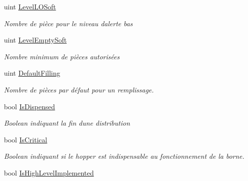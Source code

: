 \begin{DoxyCompactItemize}
uint \mbox{\hyperlink{class_device_library_1_1_c_hopper_a27713aed4b5a8f43ec2998ddec6ad5f2}{Level\+L\+O\+Soft}}
\begin{DoxyCompactList}\small\item\em Nombre de pièce pour le niveau d\textquotesingle{}alerte bas \end{DoxyCompactList}\item 
uint \mbox{\hyperlink{class_device_library_1_1_c_hopper_aa319784d7be6861029637485981d5bc8}{Level\+Empty\+Soft}}
\begin{DoxyCompactList}\small\item\em Nombre minimum de pièces autorisées \end{DoxyCompactList}\item 
uint \mbox{\hyperlink{class_device_library_1_1_c_hopper_ad75b00a2bcc10f3340ffb6b3735bea7a}{Default\+Filling}}
\begin{DoxyCompactList}\small\item\em Nombre de pièces par défaut pour un remplissage. \end{DoxyCompactList}\item 
bool \mbox{\hyperlink{class_device_library_1_1_c_hopper_a1cb25d14b95a28dcd510b354b784a4ab}{Is\+Dispensed}}
\begin{DoxyCompactList}\small\item\em Boolean indiquant la fin d\textquotesingle{}une distribution \end{DoxyCompactList}\item 
bool \mbox{\hyperlink{class_device_library_1_1_c_hopper_a08a82f43af4ac242d87e2a73734d9159}{Is\+Critical}}
\begin{DoxyCompactList}\small\item\em Boolean indiquant si le hopper est indispensable au fonctionnement de la borne. \end{DoxyCompactList}\item 
bool \mbox{\hyperlink{class_device_library_1_1_c_hopper_a621e84f9419e3b7fd1c35f3f0a336a31}{Is\+High\+Level\+Implemented}}

\end{DoxyCompactItemize}
